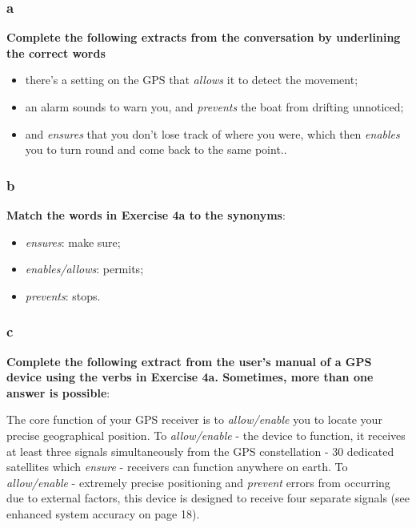 \subsubsection{a}

\textbf{Complete the following extracts from the conversation by underlining the correct words}

\begin{itemize}
\item there's a setting on the GPS that \textit{allows} it to detect the movement;
\item an alarm sounds to warn you, and \textit{prevents} the boat from drifting unnoticed;
\item and \textit{ensures} that you don't lose track of where you were, which then \textit{enables} you to turn round and come back to the same point..
\end{itemize}

\subsubsection{b}

\textbf{Match the words in Exercise 4a to the synonyms}:

\begin{itemize}

\item \textit{ensures}: make sure;
\item \textit{enables/allows}: permits;
\item \textit{prevents}: stops.

\end{itemize}

\subsubsection{c}

\textbf{Complete the following extract from the user's manual of a GPS device using the verbs in Exercise 4a. Sometimes, more than one answer is possible}:

The core function of your GPS receiver is to \textit{allow/enable} you to locate your precise geographical position. To \textit{allow/enable} - the device to function, it receives at least three signals simultaneously from the GPS constellation - 30 dedicated satellites which \textit{ensure} - receivers can function anywhere on earth. To \textit{allow/enable} - extremely precise positioning and \textit{prevent} errors from occurring due to external factors, this device is designed to receive four separate signals (see enhanced system accuracy on page 18).


